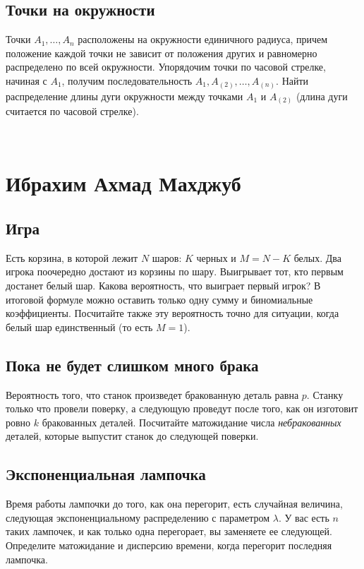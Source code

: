 \documentclass[12pt]{article}
\begin{document}
\subsection{Точки на окружности}
Точки $A_1, \dots, A_n$ расположены на окружности единичного радиуса, причем положение каждой точки не зависит от положения других и равномерно распределено по всей окружности. Упорядочим точки по часовой стрелке, начиная с $A_1$, получим последовательность $A_1, A_{(2)}, \dots, A_{(n)}$. Найти распределение длины дуги окружности между точками $A_1$ и $A_{(2)}$ (длина дуги считается по часовой стрелке).

\newpage
~
\newpage
\section{Ибрахим Ахмад Махджуб}

\subsection{Игра}
Есть корзина, в которой лежит $N$ шаров: $K$ черных и $M = N - K$ белых. Два игрока поочередно достают из корзины по шару. Выигрывает тот, кто первым достанет белый шар. Какова вероятность, что выиграет первый игрок? В итоговой формуле можно оставить только одну сумму и биномиальные коэффициенты. Посчитайте также эту вероятность точно для ситуации, когда белый шар единственный (то есть $M = 1$).

\subsection{Пока не будет слишком много брака}
Вероятность того, что станок произведет бракованную деталь равна $p$. Станку только что провели поверку, а следующую проведут после того, как он изготовит ровно $k$ бракованных деталей. Посчитайте матожидание числа \emph{небракованных} деталей, которые выпустит станок до следующей поверки.

\subsection{Экспоненциальная лампочка}
Время работы лампочки до того, как она перегорит, есть случайная величина, следующая экспоненциальному распределению с параметром $\lambda$. У вас есть $n$ таких лампочек, и как только одна перегорает, вы заменяете ее следующей. Определите матожидание и дисперсию времени, когда перегорит последняя лампочка.
\end{document}
